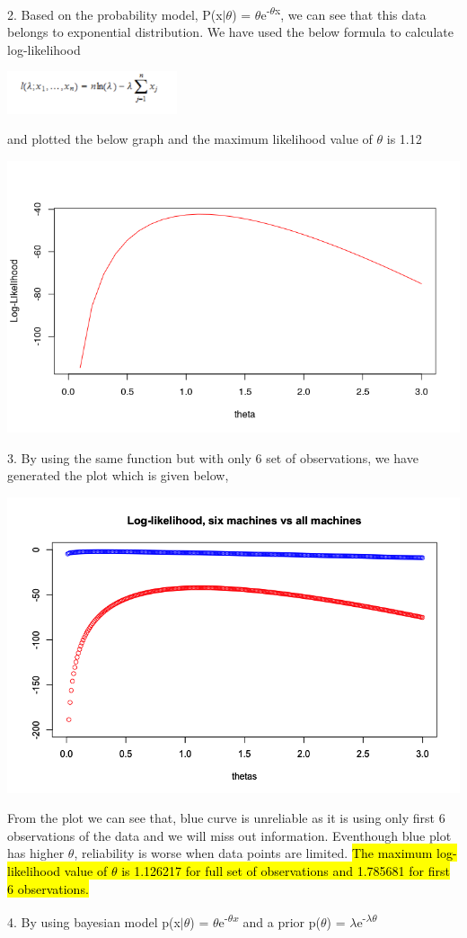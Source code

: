 \documentclass[a4paper,10pt]{article}
\begin{document}
2. Based on the probability model, P(x$|$$\theta$) = $\theta$e\textsuperscript{-$\theta$x}, we can see that
this data belongs to exponential distribution. We have used the below formula to calculate log-likelihood
\par
\begin{center}
	\includegraphics[width=50mm,scale=0.10]{Log-likelihood-formula.png}
\end{center}
and plotted the below graph and the maximum likelihood value of $\theta$ is 1.12 \par
\begin{center}
	\includegraphics[width=.5\textwidth]{log-likelihood-full-data.png}
\end{center}
3. By using the same function but with only 6 set of observations, we have generated the plot which is given below,\par
\begin{center}
	\includegraphics[width=.5\textwidth]{Log-likelihood.png}
\end{center}
From the plot we can see that, blue curve is unreliable as it is using only first 6 observations of the data and we will
miss out information. Eventhough blue plot has higher $\theta$, reliability is worse when data points are limited.
\hl{The maximum log-likelihood value of $\theta$ is 1.126217 for full set of observations and 1.785681 for first 6
observations.}\par 
\vspace{0.5cm}
\par
4. By using bayesian model p(x$|$$\theta$) = $\theta$e\textsuperscript{-$\theta$$x$} and a prior p($\theta$) = $\lambda$e\textsuperscript{-$\lambda$$\theta$}
\end{document}
